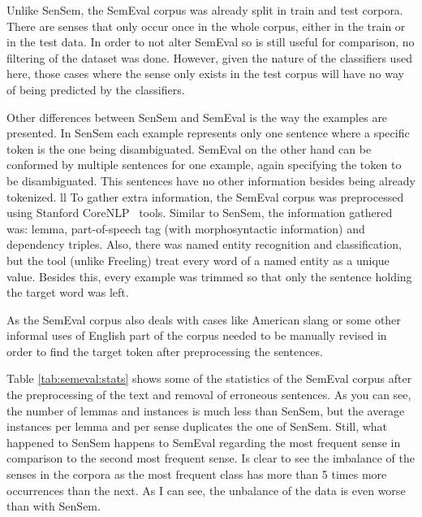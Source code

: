 Unlike SenSem, the SemEval corpus was already split in train and test
corpora. There are senses that only occur once in the whole corpus, either in
the train or in the test data. In order to not alter SemEval so is still useful
for comparison, no filtering of the dataset was done. However, given the
nature of the classifiers used here, those cases where the sense only exists in
the test corpus will have no way of being predicted by the classifiers.

Other differences between SenSem and SemEval is the way the examples are
presented. In SenSem each example represents only one sentence where a specific
token is the one being disambiguated. SemEval on the other hand can be
conformed by multiple sentences for one example, again specifying the token to
be disambiguated. This sentences have no other information besides being
already tokenized.
ll
To gather extra information, the SemEval corpus was preprocessed using
Stanford CoreNLP~\cite{manning-EtAl:2014:P14-5} tools. Similar to SenSem, the
information gathered was: lemma, part-of-speech tag (with morphosyntactic
information) and dependency triples. Also, there was named entity recognition
and classification, but the tool (unlike Freeling) treat every word of a named
entity as a unique value. Besides this, every example was trimmed so that only
the sentence holding the target word was left.

As the SemEval corpus also deals with cases like American slang or some other
informal uses of English part of the corpus needed to be manually revised in
order to find the target token after preprocessing the sentences.

Table \ref{tab:semeval:stats} shows some of the statistics of the SemEval
corpus after the preprocessing of the text and removal of erroneous sentences.
As you can see, the number of lemmas and instances is much less than SenSem,
but the average instances per lemma and per sense duplicates the one of SenSem.
Still, what happened to SenSem happens to SemEval regarding the most frequent
sense in comparison to the second most frequent sense. Is clear to see the
imbalance of the senses in the corpora as the most frequent class has more than
5 times more occurrences than the next. As I can see, the unbalance of the data
is even worse than with SenSem.

